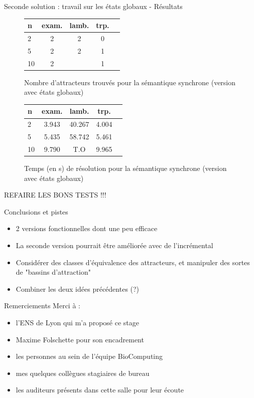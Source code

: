 \documentclass{beamer}
\begin{document}
\begin{frame}{Seconde solution : travail sur les états globaux - Résultats}
	\begin{figure}[!h]
		\begin{tabular}{l|c<{\onslide<2->}c<{\onslide<3->}c<{\onslide}c}
			n & exam. & lamb. & trp.\\ \hline
			2     & 2 & 2 & 0\\
			5     & 2 & 2 & 1\\
			10    & 2 &  & 1\\
		\end{tabular}
		\caption{Nombre d'attracteurs trouvés pour la sémantique synchrone (version avec états globaux)}
		\label{label-figure5}
	\end{figure}
	
	\begin{figure}[!h]
		\begin{tabular}{l|c<{\onslide<2->}c<{\onslide<3->}c<{\onslide}c}
			n & exam. & lamb. & trp.\\ \hline
			2     & 3.943 & 40.267 & 4.004\\
			5     & 5.435 & 58.742 & 5.461\\
			10    & 9.790 & T.O & 9.965\\
		\end{tabular}
		\caption{Temps (en s) de résolution pour la sémantique synchrone (version avec états globaux)}
		\label{label-figure5}
	\end{figure}
	REFAIRE LES BONS TESTS !!!
\end{frame}

\begin{frame}{Conclusions et pistes}
	\begin{itemize}
		\pause
		\item 2 versions fonctionnelles dont une peu efficace
		\pause
		\item La seconde version pourrait être améliorée avec de l'incrémental
		\pause
		\item Considérer des classes d'équivalence des attracteurs, et manipuler des sortes de "bassins d'attraction"
		\pause
		\item Combiner les deux idées précédentes (?)
	\end{itemize}
\end{frame}

\begin{frame}{Remerciements}
	Merci à :
	\begin{itemize}
		\item l'ENS de Lyon qui m'a proposé ce stage
		\item Maxime Folschette pour son encadrement
		\item les personnes au sein de l'équipe BioComputing
		\item mes quelques collègues stagiaires de bureau
		\item les auditeurs présents dans cette salle pour leur écoute
	\end{itemize}
\end{frame}
\end{document}
